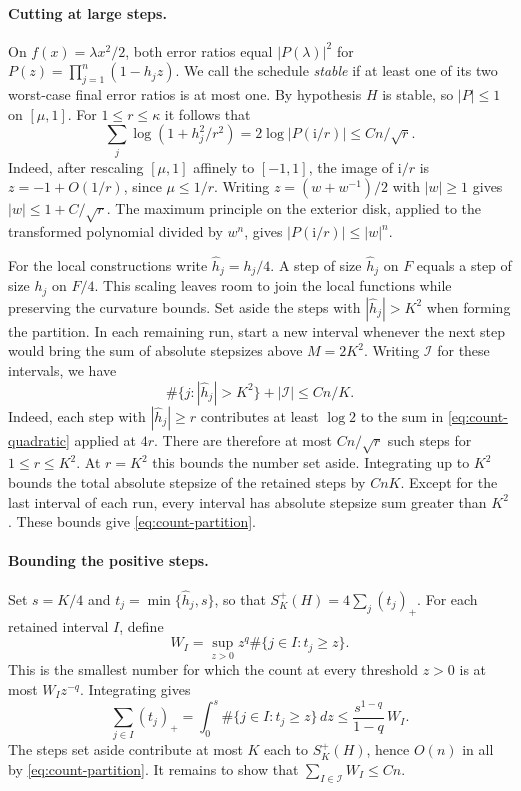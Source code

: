 \documentclass[11pt]{article}
\theoremstyle{definition}
\begin{document}
\paragraph{Cutting at large steps.}
On \(f(x)=\lambda x^2/2\), both error ratios equal \(|P(\lambda)|^2\)
for \(P(z)=\prod_{j=1}^n(1-h_j z)\). We call the schedule \emph{stable}
if at least one of its two worst-case final error ratios is at most one.
By hypothesis \(H\) is stable, so \(|P|\le1\) on \([\mu,1]\).
For \(1\le r\le\kappa\) it follows that
\begin{equation}\label{eq:count-quadratic}
 \sum_j\log(1+h_j^2/r^2)=2\log|P(\mathrm i/r)|\le Cn/\sqrt r .
\end{equation}
Indeed, after rescaling \([\mu,1]\) affinely to \([-1,1]\), the image of
\(\mathrm i/r\) is \(z=-1+O(1/r)\), since \(\mu\le1/r\).
Writing \(z=(w+w^{-1})/2\) with \(|w|\ge1\) gives \(|w|\le1+C/\sqrt r\).
The maximum principle on the exterior disk, applied to the transformed
polynomial divided by \(w^n\), gives \(|P(\mathrm i/r)|\le |w|^n\).

For the local constructions write \(\hat h_j=h_j/4\). A step of size
\(\hat h_j\) on \(F\) equals a step of size \(h_j\) on \(F/4\). This
scaling leaves room to join the local functions while preserving the
curvature bounds. Set aside the steps with \(|\hat h_j|>K^2\) when forming
the partition. In each remaining run, start a new interval whenever the
next step would bring the sum of absolute stepsizes above \(M=2K^2\).
Writing \(\mathcal I\) for these intervals, we have
\begin{equation}\label{eq:count-partition}
 \#\{j:|\hat h_j|>K^2\}+|\mathcal I|\le Cn/K .
\end{equation}
Indeed, each step with \(|\hat h_j|\ge r\) contributes at least \(\log 2\)
to the sum in \eqref{eq:count-quadratic} applied at \(4r\). There are
therefore at most \(Cn/\sqrt r\) such steps for \(1\le r\le K^2\).
At \(r=K^2\) this bounds the number set aside. Integrating up to \(K^2\)
bounds the total absolute stepsize of the retained steps by \(CnK\).
Except for the last interval of each run, every interval has absolute
stepsize sum greater than \(K^2\). These bounds give \eqref{eq:count-partition}.

\paragraph{Bounding the positive steps.}
Set \(s=K/4\) and \(t_j=\min\{\hat h_j,s\}\), so that
\(S_K^+(H)=4\sum_j(t_j)_+\). For each retained interval \(I\), define
\[
 W_I=\sup_{z>0}z^q\#\{j\in I:t_j\ge z\}.
\]
This is the smallest number for which the count at every threshold \(z>0\)
is at most \(W_I z^{-q}\). Integrating gives
\[
 \sum_{j\in I}(t_j)_+
 =\int_0^s\#\{j\in I:t_j\ge z\}\,dz
 \le\frac{s^{1-q}}{1-q}\,W_I .
\]
The steps set aside contribute at most \(K\) each to \(S_K^+(H)\), hence
\(O(n)\) in all by \eqref{eq:count-partition}. It remains to show that
\(\sum_{I\in\mathcal I}W_I\le Cn\).
\end{document}
